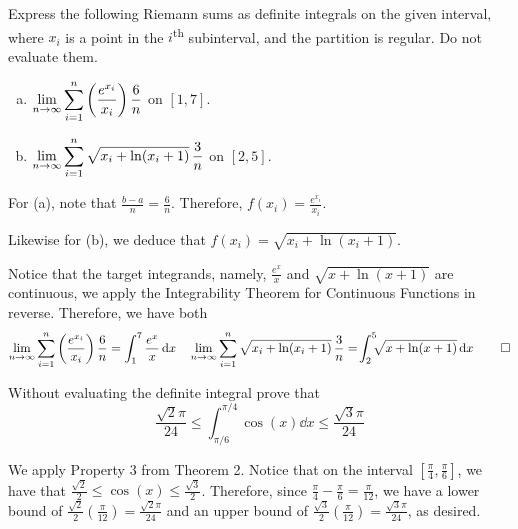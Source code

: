 \documentclass{agony}
\begin{document}
\begin{prob}
  Express the following Riemann sums as definite integrals on the given interval,
  where $x_i$ is a point in the $i$\textsuperscript{th} subinterval,
  and the partition is regular. Do not evaluate them.
  \begin{enumerate}[(a)]
    \item $\displaystyle\lim_{n\to\infty}\sum_{i=1}^n\left(\frac{e^{x_i}}{x_i}\right)\frac{6}{n}$ on $[1,7]$.
    \item $\displaystyle\lim_{n\to\infty}\sum_{i=1}^n\sqrt{x_i + \ln(x_i + 1)}\,\frac{3}{n}$ on $[2,5]$.
  \end{enumerate}
\end{prob}
\begin{sol}
  For (a), note that $\frac{b-a}{n} = \frac{6}{n}$.
  Therefore, $f(x_i) = \frac{e^{x_i}}{x_i}$.

  Likewise for (b), we deduce that $f(x_i) = \sqrt{x_i+\ln(x_i+1)}$.

  Notice that the target integrands, namely, $\frac{e^x}{x}$ and $\sqrt{x+\ln(x+1)}$ are continuous,
  we apply the Integrability Theorem for Continuous Functions in reverse.
  Therefore, we have both
  \[
    \lim_{n\to\infty}\sum_{i=1}^n\left(\frac{e^{x_i}}{x_i}\right)\frac{6}{n} = \int_1^7 \frac{e^x}{x} \dd{x}
    \quad
    \lim_{n\to\infty}\sum_{i=1}^n\sqrt{x_i + \ln(x_i + 1)}\,\frac{3}{n} = \!\int_2^5\!\!\!\sqrt{x+\ln(x+1)} \dd{x}
    \qedhere
  \]
\end{sol}

\begin{prob}
  Without evaluating the definite integral prove that
  \[ \frac{\sqrt2 \pi}{24} \leq \int_{\pi/6}^{\pi/4} \cos(x) \dd{x} \leq \frac{\sqrt3 \pi}{24} \]
\end{prob}
\begin{prf}
  We apply Property 3 from Theorem 2.
  Notice that on the interval $[\frac\pi4, \frac\pi6]$,
  we have that $\frac{\sqrt2}{2} \leq \cos(x) \leq \frac{\sqrt3}{2}$.
  Therefore, since $\frac{\pi}{4}-\frac{\pi}{6} = \frac{\pi}{12}$,
  we have a lower bound of $\frac{\sqrt2}{2}(\frac{\pi}{12}) = \frac{\sqrt2 \pi}{24}$
  and an upper bound of $\frac{\sqrt3}{2}(\frac{\pi}{12}) = \frac{\sqrt3 \pi}{24}$,
  as desired.
\end{prf}
\end{document}
